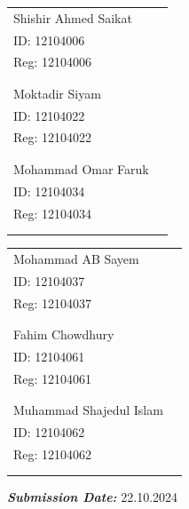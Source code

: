 \documentclass[12pt,a4paper]{article}
\begin{document}
	\begin{multicols}{2}
	\centering
	\hspace{10cm}
		\begin{tabular}{ll}
		Shishir Ahmed Saikat \\
		ID: 12104006 \\
		Reg: 12104006 \\ \\\\ 
		
		
		Moktadir Siyam \\
		ID: 12104022 \\
		Reg: 12104022 \\ \\\\ 
		
		Mohammad Omar Faruk \\
		ID: 12104034 \\
		Reg: 12104034 \\ \\\\ 
		
	\end{tabular}
	
	\hspace{10cm}
	 \begin{tabular}{ll}
	Mohammad AB Sayem \\
	ID: 12104037 \\
	Reg: 12104037 \\ \\\\ 
	
	
	Fahim Chowdhury \\
	ID: 12104061 \\
	Reg: 12104061 \\ \\\\ 
	
	Muhammad Shajedul Islam \\
	ID: 12104062 \\
	Reg: 12104062 \\ \\\\ 
	
\end{tabular}
\end{multicols}

\vspace{2cm}

 \hspace{8cm} \LARGE\textbf{\textit{Submission Date:}} 22.10.2024
	
\end{document}
